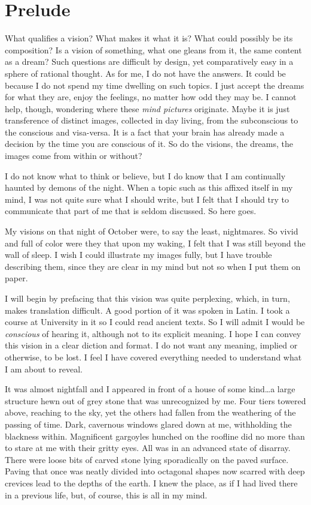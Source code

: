 \chapter{Prelude}\label{prelude}

What qualifies a vision? What makes it what it is? What could possibly
be its composition? Is a vision of something, what one gleans from it,
the same content as a dream? Such questions are difficult by design, yet
comparatively easy in a sphere of rational thought. As for me, I do not
have the answers. It could be because I do not spend my time dwelling on
such topics. I just accept the dreams for what they are, enjoy the
feelings, no matter how odd they may be. I cannot help, though,
wondering where these \emph{mind pictures} originate. Maybe it is just
transference of distinct images, collected in day living, from the
subconscious to the conscious and visa-versa. It is a fact that your
brain has already made a decision by the time you are conscious of it.
So do the visions, the dreams, the images come from within or without?

I do not know what to think or believe, but I do know that I am
continually haunted by demons of the night. When a topic such as this
affixed itself in my mind, I was not quite sure what I should write, but
I felt that I should try to communicate that part of me that is seldom
discussed. So here goes.

My visions on that night of October were, to say the least, nightmares.
So vivid and full of color were they that upon my waking, I felt that I
was still beyond the wall of sleep. I wish I could illustrate my images
fully, but I have trouble describing them, since they are clear in my
mind but not so when I put them on paper.

I will begin by prefacing that this vision was quite perplexing, which,
in turn, makes translation difficult. A good portion of it was spoken in
Latin. I took a course at University in it so I could read ancient
texts. So I will admit I would be \emph{conscious} of hearing it,
although not to its explicit meaning. I hope I can convey this vision in
a clear diction and format. I do not want any meaning, implied or
otherwise, to be lost. I feel I have covered everything needed to
understand what I am about to reveal.

It was almost nightfall and I appeared in front of a house of some
kind\ldots a large structure hewn out of grey stone that was
unrecognized by me. Four tiers towered above, reaching to the sky, yet
the others had fallen from the weathering of the passing of time. Dark,
cavernous windows glared down at me, withholding the blackness within.
Magnificent gargoyles hunched on the roofline did no more than to stare
at me with their gritty eyes. All was in an advanced state of disarray.
There were loose bits of carved stone lying sporadically on the paved
surface. Paving that once was neatly divided into octagonal shapes now
scarred with deep crevices lead to the depths of the earth. I knew the
place, as if I had lived there in a previous life, but, of course, this
is all in my mind.

